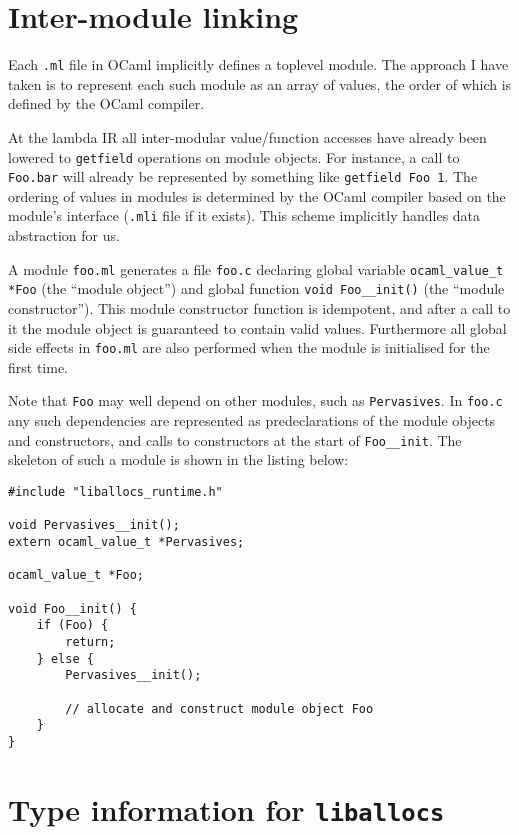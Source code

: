 \documentclass[12pt,a4paper,twoside,openright]{report}
\begin{document}
\section{Inter-module linking}

Each \lstinline!.ml! file in OCaml implicitly defines a toplevel module. The approach I have taken is to represent each such module as an array of values, the order of which is defined by the OCaml compiler.

At the lambda IR all inter-modular value/function accesses have already been
lowered to \lstinline!getfield! operations on module objects. For instance, a
call to \lstinline!Foo.bar! will already be represented by something like
\lstinline!getfield Foo 1!. The ordering of values in modules is determined by
the OCaml compiler based on the module's interface (\lstinline!.mli! file if it
exists). This scheme implicitly handles data abstraction for us.

A module \lstinline!foo.ml! generates a file \lstinline!foo.c! declaring global
variable \lstinline!ocaml_value_t *Foo! (the ``module object'') and global
function \lstinline!void Foo__init()! (the ``module constructor''). This module
constructor function is idempotent, and after a call to it the module object is
guaranteed to contain valid values. Furthermore all global side effects in
\lstinline!foo.ml! are also performed when the module is initialised for the
first time.

Note that \lstinline!Foo! may well depend on other modules, such as
\lstinline!Pervasives!. In \lstinline!foo.c! any such dependencies are
represented as predeclarations of the module objects and constructors, and
calls to constructors at the start of \lstinline!Foo__init!. The skeleton of
such a module is shown in the listing below:

\begin{lstlisting}
#include "liballocs_runtime.h"

void Pervasives__init();
extern ocaml_value_t *Pervasives;

ocaml_value_t *Foo;

void Foo__init() {
    if (Foo) {
        return;
    } else {
        Pervasives__init();

        // allocate and construct module object Foo
    }
}
\end{lstlisting}

\section{Type information for \texttt{liballocs}}
\end{document}
